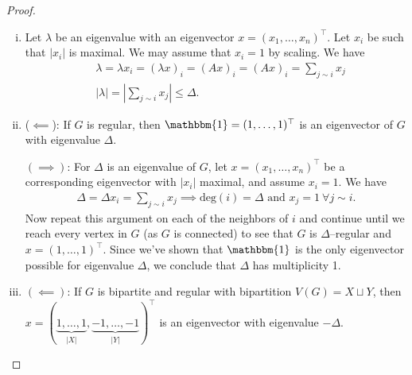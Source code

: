 \documentclass{article}
\theoremstyle{definition}
\begin{document}
\begin{proof}
    \begin{enumerate}[(i)]
        \item Let $\lambda$ be an eigenvalue with an eigenvector $x=(x_1,\ldots,x_n)^\top$. Let $x_i$ be such that $|x_i|$ is maximal. We may assume that $x_i=1$ by scaling. We have 
        \begin{align*}
            &\lambda = \lambda x_i = (\lambda x)_i = (Ax)_i = (Ax)_i = \sum_{j \sim i}^{} x_j\\
            &|\lambda|= |\sum_{j\sim i }^{} x_j| \le \Delta.
        \end{align*}
        \item ($\impliedby$): If $G$ is regular, then $\mathbbm{1}=(1,\ldots,1)^\top$ is an eigenvector of $G$ with eigenvalue $\Delta$.
        \vspace{1mm}
        
        $(\implies)$: For $\Delta$ is an eigenvalue of $G$, let $x=(x_1,\ldots,x_n)^\top$ be a corresponding eigenvector with $|x_i|$ maximal, and assume $x_i=1$. We have
        \begin{align*}
            \Delta = \Delta x_i = \sum_{j \sim i }^{} x_j \implies \text{deg}(i)=\Delta \text{ and } x_j=1 ~\forall j \sim i.
        \end{align*}
        Now repeat this argument on each of the neighbors of $i$ and continue until we reach every vertex in $G$ (as $G$ is connected) to see that $G$ is $\Delta$--regular and $x=(1,\ldots,1)^\top$. Since we've shown that $\mathbbm{1}$ is the only eigenvector possible for eigenvalue $\Delta$, we conclude that $\Delta$ has multiplicity 1.
        \item $(\impliedby)$: If $G$ is bipartite and regular with bipartition $V(G) = X \sqcup Y$, then $x = (\underbrace{1,\ldots,1}_{|X|}, \underbrace{-1,\ldots,-1}_{|Y|})^\top$ is an eigenvector with eigenvalue $-\Delta$.
        \vspace{1mm}
        

\end{enumerate}
\end{proof}
\end{document}

